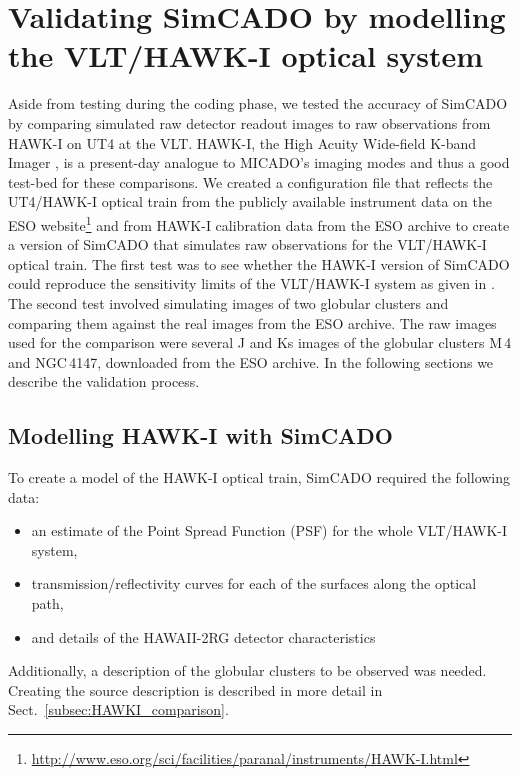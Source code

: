 \section{Validating SimCADO by modelling the VLT/HAWK-I optical system}
\label{sec:hawki}

Aside from testing during the coding phase, we tested the accuracy of SimCADO by comparing simulated raw detector readout images to raw observations from HAWK-I on UT4 at the VLT. HAWK-I, the High Acuity Wide-field K-band Imager \citep{hawki}, is a present-day analogue to MICADO's imaging modes and thus a good test-bed for these comparisons. We created a configuration file that reflects the UT4/HAWK-I optical train from the publicly available instrument data on the ESO website\footnote{\url{http://www.eso.org/sci/facilities/paranal/instruments/HAWK-I.html}} and from HAWK-I calibration data from the ESO archive to create a version of SimCADO that simulates raw observations for the VLT/HAWK-I optical train. The first test was to see whether the HAWK-I version of SimCADO could reproduce the sensitivity limits of the VLT/HAWK-I system as given in \citet{hawki}. The second test involved simulating images of two globular clusters and comparing them against the real images from the ESO archive. The raw images used for the comparison were several J and Ks images of the globular clusters M\,4 and NGC\,4147, downloaded from the ESO archive. In the following sections we describe the validation process.

\subsection{Modelling HAWK-I with SimCADO}

To create a model of the HAWK-I optical train, SimCADO required the following data:
\begin{itemize}
    \item an estimate of the Point Spread Function (PSF) for the whole VLT/HAWK-I system,
    \item transmission/reflectivity curves for each of the surfaces along the optical path, 
    \item and details of the HAWAII-2RG detector characteristics
\end{itemize}

Additionally, a description of the globular clusters to be observed was needed. Creating the source description is described in more detail in Sect.~\ref{subsec:HAWKI_comparison}.

